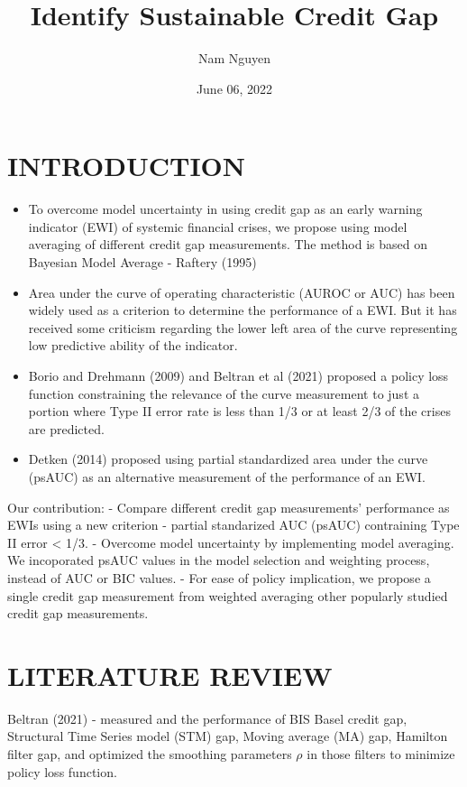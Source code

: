\documentclass[
  12pt,
]{article}
\title{Identify Sustainable Credit Gap}
\author{Nam Nguyen}
\date{June 06, 2022}
\begin{document}
\maketitle

\hypertarget{introduction}{%
\section{INTRODUCTION}\label{introduction}}

\begin{itemize}
\item
  To overcome model uncertainty in using credit gap as an early warning indicator (EWI) of systemic financial crises, we propose using model averaging of different credit gap measurements. The method is based on Bayesian Model Average - Raftery (1995)
\item
  Area under the curve of operating characteristic (AUROC or AUC) has been widely used as a criterion to determine the performance of a EWI. But it has received some criticism regarding the lower left area of the curve representing low predictive ability of the indicator.
\item
  Borio and Drehmann (2009) and Beltran et al (2021) proposed a policy loss function constraining the relevance of the curve measurement to just a portion where Type II error rate is less than 1/3 or at least 2/3 of the crises are predicted.\\
\item
  Detken (2014) proposed using partial standardized area under the curve (psAUC) as an alternative measurement of the performance of an EWI.
\end{itemize}

Our contribution:
- Compare different credit gap measurements' performance as EWIs using a new criterion - partial standarized AUC (psAUC) contraining Type II error \textless{} 1/3.
- Overcome model uncertainty by implementing model averaging. We incoporated psAUC values in the model selection and weighting process, instead of AUC or BIC values.
- For ease of policy implication, we propose a single credit gap measurement from weighted averaging other popularly studied credit gap measurements.

\hypertarget{literature-review}{%
\section{LITERATURE REVIEW}\label{literature-review}}

Beltran (2021) - measured and the performance of BIS Basel credit gap, Structural Time Series model (STM) gap, Moving average (MA) gap, Hamilton filter gap, and optimized the smoothing parameters \(\rho\) in those filters to minimize policy loss function.
\end{document}
